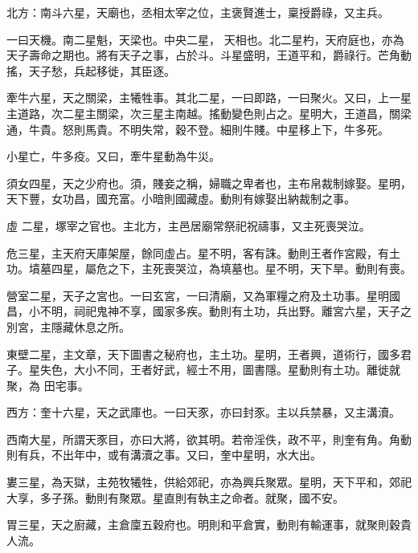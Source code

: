 \begin{pinyinscope}
 北方：南斗六星，天廟也，丞相太宰之位，主褒賢進士，稟授爵祿，又主兵。



 一曰天機。南二星魁，天梁也。中央二星，
 天相也。北二星杓，天府庭也，亦為天子壽命之期也。將有天子之事，占於斗。斗星盛明，王道平和，爵祿行。芒角動搖，天子愁，兵起移徙，其臣逐。



 牽牛六星，天之關梁，主犧牲事。其北二星，一曰即路，一曰聚火。又曰，上一星主道路，次二星主關梁，次三星主南越。搖動變色則占之。星明大，王道昌，關梁通，牛貴。怒則馬貴。不明失常，穀不登。細則牛賤。中星移上下，牛多死。



 小星亡，牛多疫。又曰，牽牛星動為牛災。



 須女四星，天之少府也。須，賤妾之稱，婦職之卑者也，主布帛裁制嫁娶。星明，天下豐，女功昌，國充富。小暗則國藏虛。動則有嫁娶出納裁制之事。



 虛
 二星，塚宰之官也。主北方，主邑居廟常祭祀祝禱事，又主死喪哭泣。



 危三星，主天府天庫架屋，餘同虛占。星不明，客有誅。動則王者作宮殿，有土功。墳墓四星，屬危之下，主死喪哭泣，為填墓也。星不明，天下旱。動則有喪。



 營室二星，天子之宮也。一曰玄宮，一曰清廟，又為軍糧之府及土功事。星明國昌，小不明，祠祀鬼神不享，國家多疾。動則有土功，兵出野。離宮六星，天子之別宮，主隱藏休息之所。



 東壁二星，主文章，天下圖書之秘府也，主土功。星明，王者興，道術行，國多君子。星失色，大小不同，王者好武，經士不用，圖書隱。星動則有土功。離徙就聚，為
 田宅事。



 西方：奎十六星，天之武庫也。一曰天豕，亦曰封豕。主以兵禁暴，又主溝瀆。



 西南大星，所謂天豕目，亦曰大將，欲其明。若帝淫佚，政不平，則奎有角。角動則有兵，不出年中，或有溝瀆之事。又曰，奎中星明，水大出。



 婁三星，為天獄，主苑牧犧牲，供給郊祀，亦為興兵聚眾。星明，天下平和，郊祀大享，多子孫。動則有聚眾。星直則有執主之命者。就聚，國不安。



 胃三星，天之廚藏，主倉廩五穀府也。明則和平倉實，動則有輸運事，就聚則穀貴人流。




\end{pinyinscope}
